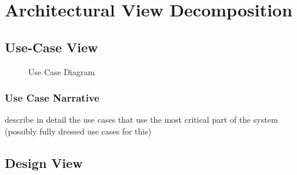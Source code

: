 \documentclass[11pt]{article}
\begin{document}
\section{Architectural View Decomposition}
\subsection{Use-Case View}
\begin{figure}[H]
	\caption{Use Case Diagram}
\end{figure}
\subsubsection{Use Case Narrative}
describe in detail the use cases that use the most critical part of the system (possibly fully dressed use cases for this)
\subsection{Design View}
\end{document}
